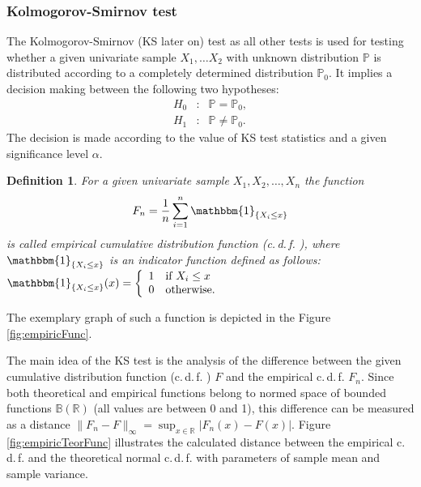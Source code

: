 \documentclass[a4paper, 12pt, titlepage, headsepline, listof = totoc, bibliography = totoc, numbers = noenddot]{scrartcl}
\newcommand{\cdf}{c.\,d.\,f. }
\newtheorem{df}{Definition}
\begin{document}
\subsubsection{Kolmogorov-Smirnov test}\label{sec:kolm-smir}
The Kolmogorov-Smirnov (KS later on) test as all other tests is used for testing
whether a given univariate sample $X_1,\dots X_2$ with unknown distribution $\mathbb{P}$ is distributed according to a completely determined
distribution $\mathbb{P}_0$. It implies a decision making between the following
two hypotheses:
\[\begin{array}{rcl}
H_0 & : & \mathbb{P} = \mathbb{P}_0,\\
H_1 & : & \mathbb{P} \ne \mathbb{P}_0.
\end{array}\]
The decision is made according to the value of KS test
statistics and a given significance level $\alpha$.

\begin{df}
For a given univariate sample $X_1, X_2, \dots, X_n$ the function
\[F_n=\frac{1}{n}\sum_{i=1}^n \mathbbm{1}_{\{X_i\le x\}}\] is called empirical
cumulative distribution function (\cdf), where $\mathbbm{1}_{\{X_i\le x\}}$ is an
indicator function defined as follows: $\mathbbm{1}_{\{X_i\le x\}}(x)=\left\lbrace 
\begin{array}{cll}
                 1 & \mbox{if} \ X_i\le x\\
                 0 & \mbox{otherwise}.
\end{array} 
\right.$
\end{df}
The exemplary graph of such a function is depicted in the Figure
\ref{fig:empiricFunc}. 

The main idea of the KS test is the analysis of the difference between the given
cumulative distribution function (\cdf) $F$ and the empirical \cdf $F_n$. Since
both theoretical and empirical functions belong to normed space of bounded
functions $\mathbb{B}(\mathbb{R})$ (all values are between 0 and 1), this difference can be measured as
a distance $\|F_n-F\|_{\infty}=\sup_{x \in \mathbb{R}}|F_n(x)-F(x)|$. Figure
\ref{fig:empiricTeorFunc} illustrates the calculated distance between the
empirical \cdf and the theoretical normal \cdf with parameters of sample mean
and sample variance. 
\end{document}
